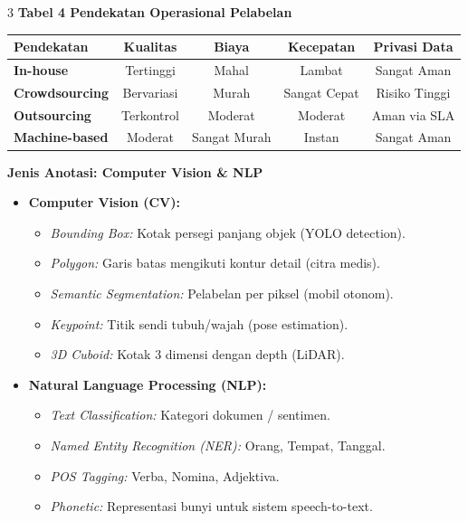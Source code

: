 \documentclass[6.8pt,landscape,a4paper]{extarticle}
\newcommand{\sdtSub}[1]{%
    \vspace{0.5pt}%
    \noindent\textbf{\fontsize{5.8pt}{6.8pt}\selectfont\color{sdtBlue}#1}\vspace{0.1pt}%
}
\begin{document}
\begin{multicols}{3}
\sdtSub{Tabel 4 Pendekatan Operasional Pelabelan}
\begin{center}
{\fontsize{4.8pt}{5.8pt}\selectfont
\begin{tabularx}{\linewidth}{@{}lcccc@{}}
\toprule
\textbf{Pendekatan} & \textbf{Kualitas} & \textbf{Biaya} & \textbf{Kecepatan} & \textbf{Privasi Data} \\
\midrule
\textbf{In-house} & Tertinggi & Mahal & Lambat & Sangat Aman \\
\textbf{Crowdsourcing} & Bervariasi & Murah & Sangat Cepat & Risiko Tinggi \\
\textbf{Outsourcing} & Terkontrol & Moderat & Moderat & Aman via SLA \\
\textbf{Machine-based} & Moderat & Sangat Murah & Instan & Sangat Aman \\
\bottomrule
\end{tabularx}}
\end{center}

\sdtSub{Jenis Anotasi: Computer Vision \& NLP}
\begin{itemize}
    \item \textbf{Computer Vision (CV):}
    \begin{itemize}
        \item \textit{Bounding Box:} Kotak persegi panjang objek (YOLO detection).
        \item \textit{Polygon:} Garis batas mengikuti kontur detail (citra medis).
        \item \textit{Semantic Segmentation:} Pelabelan per piksel (mobil otonom).
        \item \textit{Keypoint:} Titik sendi tubuh/wajah (pose estimation).
        \item \textit{3D Cuboid:} Kotak 3 dimensi dengan depth (LiDAR).
    \end{itemize}
    \item \textbf{Natural Language Processing (NLP):}
    \begin{itemize}
        \item \textit{Text Classification:} Kategori dokumen / sentimen.
        \item \textit{Named Entity Recognition (NER):} Orang, Tempat, Tanggal.
        \item \textit{POS Tagging:} Verba, Nomina, Adjektiva.
        \item \textit{Phonetic:} Representasi bunyi untuk sistem speech-to-text.
    \end{itemize}
\end{itemize}


\end{multicols}
\end{document}
